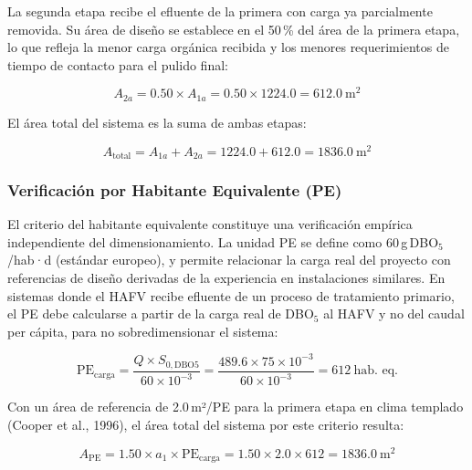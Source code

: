 \documentclass[12pt,a4paper]{article}
\begin{document}
La segunda etapa recibe el efluente de la primera con carga ya parcialmente removida. Su área de diseño se establece en el 50\,\% del área de la primera etapa, lo que refleja la menor carga orgánica recibida y los menores requerimientos de tiempo de contacto para el pulido final:

\begin{equation}
A_{2a} = 0.50 \times A_{1a} = 0.50 \times 1224.0 = 612.0\ \text{m}^2
\end{equation}

El área total del sistema es la suma de ambas etapas:

\begin{equation}
A_\text{total} = A_{1a} + A_{2a} = 1224.0 + 612.0 = 1836.0\ \text{m}^2
\end{equation}

\subsubsection*{Verificación por Habitante Equivalente (PE)}

El criterio del habitante equivalente constituye una verificación empírica independiente del dimensionamiento. La unidad PE se define como 60\,g\,DBO$_5$/hab·d (estándar europeo), y permite relacionar la carga real del proyecto con referencias de diseño derivadas de la experiencia en instalaciones similares. En sistemas donde el HAFV recibe efluente de un proceso de tratamiento primario, el PE debe calcularse a partir de la carga real de DBO$_5$ al HAFV y no del caudal per cápita, para no sobredimensionar el sistema:

\begin{equation}
\text{PE}_\text{carga} = \frac{Q \times S_{0,\text{DBO5}}}{60 \times 10^{-3}} = \frac{489.6 \times 75 \times 10^{-3}}{60 \times 10^{-3}} = 612\ \text{hab. eq.}
\end{equation}

Con un área de referencia de 2.0\,m²/PE para la primera etapa en clima templado (Cooper et al., 1996), el área total del sistema por este criterio resulta:

\begin{equation}
A_\text{PE} = 1.50 \times a_1 \times \text{PE}_\text{carga} = 1.50 \times 2.0 \times 612 = 1836.0\ \text{m}^2
\end{equation}
\end{document}
